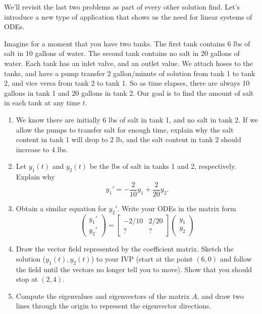 We'll revisit the last two problems as part of every other solution find.  Let's introduce a new type of application that shows us the need for linear systems of ODEs.

\begin{problem}
 Imagine for a moment that you have two tanks. The first tank contains 6 lbs of salt in 10 gallons of water. The second tank contains no salt in 20 gallons of water.  Each tank has an inlet valve, and an outlet value.  We attach hoses to the tanks, and have a pump transfer 2 gallon/minute of solution from tank 1 to tank 2, and vice versa from tank 2 to tank 1. So as time elapses, there are always 10 gallons in tank 1 and 20 gallons in tank 2. Our goal is to find the amount of salt in each tank at any time $t$. 
\begin{enumerate}
 \item We know there are initially 6 lbs of salt in tank 1, and no salt in tank 2. If we allow the pumps to transfer salt for enough time, explain why the salt content in tank 1 will drop to 2 lb, and the salt content in tank 2 should increase to 4 lbs.
 \item Let $y_1(t)$ and $y_2(t)$ be the lbs of salt in tanks 1 and 2, respectively.  Explain why 
$$y_1 ' = -\frac{2}{10}y_1+\frac{2}{20}y_2.$$
 \item Obtain a similar equation for $y_2'$. Write your ODEs in the matrix form 
$$
\begin{pmatrix}
 y_1'\\y_2'
\end{pmatrix}
=
\begin{bmatrix}
 -2/10 & 2/20\\
 ? & ?
\end{bmatrix}
\begin{pmatrix}
 y_1\\y_2
\end{pmatrix}
$$
\item Draw the vector field represented by the coefficient matrix. Sketch the solution ($y_1(t),y_2(t)$) to your IVP (start at the point $(6,0)$ and follow the field until the vectors no longer tell you to move).  Show that you should stop at $(2,4)$.
\item {}%
Compute the eigenvalues and eigenvectors of the matrix $A$, and draw two lines through the origin to represent the eigenvector directions.
\end{enumerate}

\end{problem}


